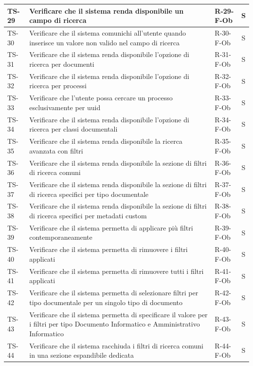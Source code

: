 \documentclass[a4paper,12pt]{article}
\begin{document}
\begin{longtable}{|p{1.5cm}|p{8.3cm}|p{2.4cm}|c|}
\hline
TS-29 & Verificare che il sistema renda disponibile un campo di ricerca & R-29-F-Ob & S \\
\hline
TS-30 & Verificare che il sistema comunichi all'utente quando inserisce un valore non valido nel campo di ricerca & R-30-F-Ob & S \\
\hline
TS-31 & Verificare che il sistema renda disponibile l'opzione di ricerca per documenti & R-31-F-Ob & S \\
\hline
TS-32 & Verificare che il sistema renda disponibile l'opzione di ricerca per processi & R-32-F-Ob & S \\
\hline
TS-33 & Verificare che l'utente possa cercare un processo esclusivamente per uuid & R-33-F-Ob & S \\
\hline
TS-34 & Verificare che il sistema renda disponibile l'opzione di ricerca per classi documentali & R-34-F-Ob & S \\
\hline
TS-35 & Verificare che il sistema renda disponibile la ricerca avanzata con filtri & R-35-F-Ob & S \\
\hline
TS-36 & Verificare che il sistema renda disponibile la sezione di filtri di ricerca comuni & R-36-F-Ob & S \\
\hline
TS-37 & Verificare che il sistema renda disponibile la sezione di filtri di ricerca specifici per tipo documentale & R-37-F-Ob & S \\
\hline
TS-38 & Verificare che il sistema renda disponibile la sezione di filtri di ricerca specifici per metadati custom & R-38-F-Ob & S \\
\hline
TS-39 & Verificare che il sistema permetta di applicare più filtri contemporaneamente & R-39-F-Ob & S \\
\hline
TS-40 & Verificare che il sistema permetta di rimuovere i filtri applicati & R-40-F-Ob & S \\
\hline
TS-41 & Verificare che il sistema permetta di rimuovere tutti i filtri applicati & R-41-F-Ob & S \\
\hline
TS-42 & Verificare che il sistema permetta di selezionare filtri per tipo documentale per un singolo tipo di documento & R-42-F-Ob & S \\
\hline
TS-43 & Verificare che il sistema permetta di specificare il valore per i filtri per tipo Documento Informatico e Amministrativo Informatico & R-43-F-Ob & S \\
\hline
TS-44 & Verificare che il sistema racchiuda i filtri di ricerca comuni in una sezione espandibile dedicata & R-44-F-Ob & S \\

\end{longtable}
\end{document}
